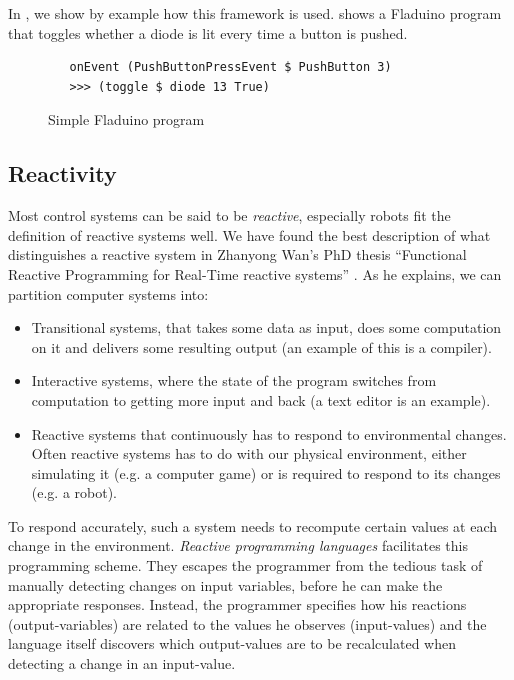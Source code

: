 \documentclass[a4paper, oneside, final]{memoir}
\let\fref\undefined
\let\Fref\undefined
\begin{document}
In \fref{sec:pushbuttondef}, we show by example how this framework is
used. \Fref{fig:fladuino-simple} shows a Fladuino program that toggles
whether a diode is lit every time a button is pushed.

\begin{figure}
  \centering

\begin{verbatim}
   onEvent (PushButtonPressEvent $ PushButton 3)  
   >>> (toggle $ diode 13 True)
\end{verbatim}  

  \caption{Simple Fladuino program}
  \label{fig:fladuino-simple}
\end{figure}

\subsection{Reactivity}

Most control systems can be said to be \textit{reactive}, especially
robots fit the definition of reactive systems well.  We have found the
best description of what distinguishes a reactive system in Zhanyong
Wan's PhD thesis ``Functional Reactive Programming for Real-Time
reactive systems'' \cite{Chambers1992}.  As he explains, we can
partition computer systems into:
\begin{itemize}
\item Transitional systems, that takes some data as input, does some
  computation on it and delivers some resulting output (an example of this
  is a compiler).
\item Interactive systems, where the state of the program switches
  from computation to getting more input and back (a text editor is an
  example).
\item Reactive systems that continuously has to respond to
  environmental changes. Often reactive systems has to do with our
  physical environment, either simulating it (e.g. a computer game) or
  is required to respond to its changes (e.g. a robot).
\end{itemize}

To respond accurately, such a system needs to recompute certain values
at each change in the environment. \textit{Reactive programming
  languages} facilitates this programming scheme. They escapes the
programmer from the tedious task of manually detecting changes on
input variables, before he can make the appropriate
responses. Instead, the programmer specifies how his reactions
(output-variables) are related to the values he observes
(input-values) and the language itself discovers which output-values
are to be recalculated when detecting a change in an input-value.
\end{document}

